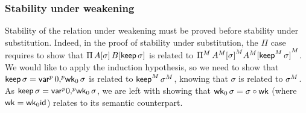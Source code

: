 

  \subsubsection{Stability under weakening}
  Stability of the relation under
  weakening must be proved before stability under substitution.
  Indeed, in the proof of stability under substitution, the $\Pi$ case
  requires to show that $\Pi \,A[\sigma] \,B[\mathsf{keep}\,\sigma]$ is related to
  ${\Pi}^M\,{A}^M{[\sigma]}^M
  {A}^M{[{\mathsf{keep}}^M\,\sigma]}^M$.
  We would like to apply the induction hypothesis, so we need to show that
  $\mathsf{keep}\,\sigma={\mathsf{var}}^p\,0{,}^p\mathsf{wk}_0\,\sigma$ is related to
  ${\mathsf{keep}}^M\,{\sigma}^M$, knowing that $\sigma$ is
  related to ${\sigma}^M$.
  As $\mathsf{keep}\,\sigma={\mathsf{var}}^p 0{,}^p \mathsf{wk}_0\,\sigma$, we are left with showing that
  $\mathsf{wk}_0\,\sigma=\sigma\circ\mathsf{wk}$ (where $\mathsf{wk}=\mathsf{wk}_0 \mathsf{id}$)
  relates to its semantic counterpart.





